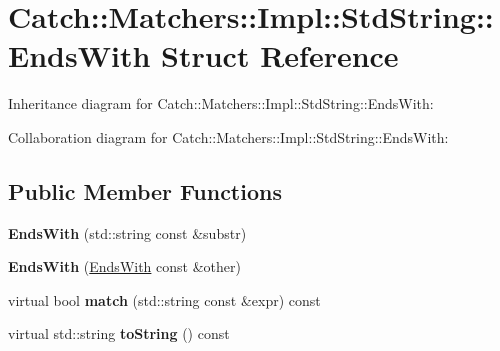\hypertarget{struct_catch_1_1_matchers_1_1_impl_1_1_std_string_1_1_ends_with}{}\section{Catch\+:\+:Matchers\+:\+:Impl\+:\+:Std\+String\+:\+:Ends\+With Struct Reference}
\label{struct_catch_1_1_matchers_1_1_impl_1_1_std_string_1_1_ends_with}


Inheritance diagram for Catch\+:\+:Matchers\+:\+:Impl\+:\+:Std\+String\+:\+:Ends\+With\+:


Collaboration diagram for Catch\+:\+:Matchers\+:\+:Impl\+:\+:Std\+String\+:\+:Ends\+With\+:
\subsection*{Public Member Functions}
\begin{DoxyCompactItemize}
\item 
\hypertarget{struct_catch_1_1_matchers_1_1_impl_1_1_std_string_1_1_ends_with_a82730175f7f7475ce1ee9791e160d02d}{}{\bfseries Ends\+With} (std\+::string const \&substr)\label{struct_catch_1_1_matchers_1_1_impl_1_1_std_string_1_1_ends_with_a82730175f7f7475ce1ee9791e160d02d}

\item 
\hypertarget{struct_catch_1_1_matchers_1_1_impl_1_1_std_string_1_1_ends_with_a9321aac07fb17613a7993e99003b3be2}{}{\bfseries Ends\+With} (\hyperlink{struct_catch_1_1_matchers_1_1_impl_1_1_std_string_1_1_ends_with}{Ends\+With} const \&other)\label{struct_catch_1_1_matchers_1_1_impl_1_1_std_string_1_1_ends_with_a9321aac07fb17613a7993e99003b3be2}

\item 
\hypertarget{struct_catch_1_1_matchers_1_1_impl_1_1_std_string_1_1_ends_with_ad0e03d7f54ffa5859f84faebccf11e76}{}virtual bool {\bfseries match} (std\+::string const \&expr) const \label{struct_catch_1_1_matchers_1_1_impl_1_1_std_string_1_1_ends_with_ad0e03d7f54ffa5859f84faebccf11e76}

\item 
\hypertarget{struct_catch_1_1_matchers_1_1_impl_1_1_std_string_1_1_ends_with_a54715c94c215a1fc5fb6336acf52eb06}{}virtual std\+::string {\bfseries to\+String} () const \label{struct_catch_1_1_matchers_1_1_impl_1_1_std_string_1_1_ends_with_a54715c94c215a1fc5fb6336acf52eb06}

\end{DoxyCompactItemize}
